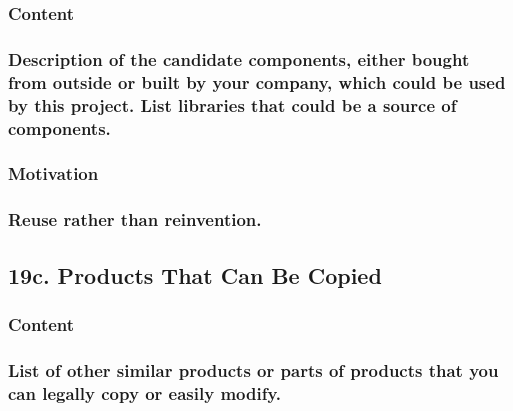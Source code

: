\documentclass[
]{article}
\begin{document}
\hypertarget{content-62}{%
\subsubsection{Content}\label{content-62}}

\hypertarget{description-of-the-candidate-components-either-bought-from-outside-or-built-by-your-company-which-could-be-used-by-this-project.-list-libraries-that-could-be-a-source-of-components.}{%
\subsubsection{Description of the candidate components, either bought
from outside or built by your company, which could be used by this
project. List libraries that could be a source of
components.}\label{description-of-the-candidate-components-either-bought-from-outside-or-built-by-your-company-which-could-be-used-by-this-project.-list-libraries-that-could-be-a-source-of-components.}}

\hypertarget{motivation-61}{%
\subsubsection{Motivation}\label{motivation-61}}

\hypertarget{reuse-rather-than-reinvention.}{%
\subsubsection{Reuse rather than
reinvention.}\label{reuse-rather-than-reinvention.}}

\hypertarget{c.-products-that-can-be-copied}{%
\subsection{\texorpdfstring{19c. Products That Can Be Copied
}{19c. Products That Can Be Copied }}\label{c.-products-that-can-be-copied}}

\hypertarget{content-63}{%
\subsubsection{Content}\label{content-63}}

\hypertarget{list-of-other-similar-products-or-parts-of-products-that-you-can-legally-copy-or-easily-modify.}{%
\subsubsection{List of other similar products or parts of products that
you can legally copy or easily
modify.}\label{list-of-other-similar-products-or-parts-of-products-that-you-can-legally-copy-or-easily-modify.}}
\end{document}
